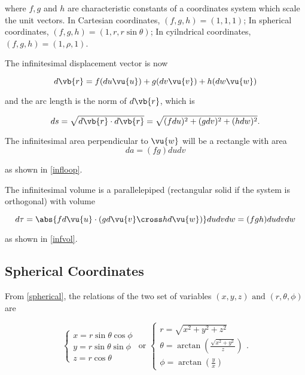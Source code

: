 \documentclass[english,a4paper,12pt]{report}
\begin{document}
where \(f,g\) and \(h\) are characteristic constants of a coordinates system which scale the unit vectors. In Cartesian coordinates, \((f,g,h) = (1,1,1)\); In spherical coordinates, \((f,g,h) = (1,r,r\sin{\theta})\); In cyilndrical coordinates, \((f,g,h) = (1,\rho ,1)\).
	
The infinitesimal displacement vector is now 

\begin{equation}
    d \vb{r} = f(du\vu{u}) + g(dv\vu{v}) + h(dw\vu{w}) \label{dl} 
\end{equation}

and the arc length is the norm of \(d \vb{r} \), which is 

\begin{equation}
    ds = \sqrt{d \vb{r} \cdot d \vb{r} } = \sqrt{(fdu)^2 + (gdv)^2 + (hdw)^2}.  
\end{equation}



The infinitesimal area perpendicular to \(\vu{w}\) will be a rectangle with area
\begin{equation}
	da = (fg)dudv \label{da}
\end{equation} 

as shown in \cref{infloop}.

	
The infinitesimal volume is a parallelepiped (rectangular solid if the system is orthogonal) with volume

\begin{equation}
    d \tau = \abs{fd \vu{u} \cdot (gd \vu{v} \cross hd \vu{w} )}dudvdw = (fgh)dudvdw 
\end{equation}

as shown in \cref{infvol}. 

	
\subsection{Spherical Coordinates}


From \cref{spherical}, the relations of the two set of variables \((x,y,z) \text { and } (r,\theta ,\phi  )\)  are

\begin{equation}
    \begin{cases} x = r\sin \theta \cos \phi \\ y = r\sin \theta \sin \phi \\ z = r\cos \theta \end{cases} \text { or } \begin{cases} r = \sqrt{x^2+y^2+z^2} \\ \displaystyle \theta = \arctan {\left(\frac{\sqrt{x^2+y^2} }{z} \right)} \\ \displaystyle \phi = \arctan {\left(\frac{y}{x}\right)} \end{cases}. 
\end{equation}
\end{document}
